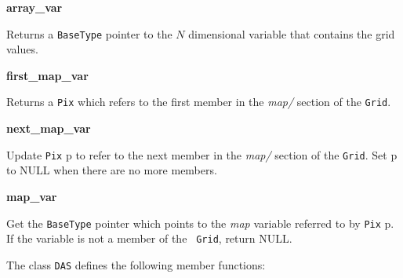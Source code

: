 \begin{description}

\item {\bf array\_var}


Returns a {\tt BaseType} pointer to the $N$ dimensional variable that
contains the grid values.

\item {\bf first\_map\_var}


Returns a {\tt Pix} which refers to the first member in the {\em map/}
section of the {\tt Grid}.

\item {\bf next\_map\_var}


Update {\tt Pix} p to refer to the next member in the {\em map/} section of
the {\tt Grid}. Set p to NULL when there are no more members.

\item {\bf map\_var}


Get the {\tt BaseType} pointer which points to the {\em map\/} variable
referred to by {\tt Pix} p. If the variable is not a member of the {\tt
Grid}, return NULL.

\end{description}

The class {\tt DAS} defines the following member functions:

